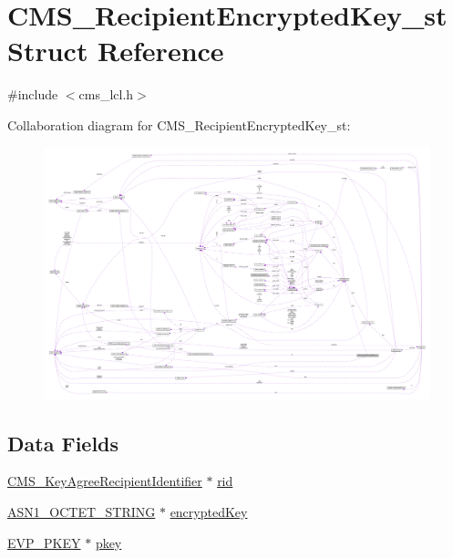 \hypertarget{struct_c_m_s___recipient_encrypted_key__st}{}\section{C\+M\+S\+\_\+\+Recipient\+Encrypted\+Key\+\_\+st Struct Reference}
\label{struct_c_m_s___recipient_encrypted_key__st}


{\ttfamily \#include $<$cms\+\_\+lcl.\+h$>$}



Collaboration diagram for C\+M\+S\+\_\+\+Recipient\+Encrypted\+Key\+\_\+st\+:\nopagebreak
\begin{figure}[H]
\begin{center}
\leavevmode
\includegraphics[width=350pt]{struct_c_m_s___recipient_encrypted_key__st__coll__graph}
\end{center}
\end{figure}
\subsection*{Data Fields}
\begin{DoxyCompactItemize}
\item 
\hyperlink{cms__lcl_8h_acafb516add3d662a5409c26641ed8f70}{C\+M\+S\+\_\+\+Key\+Agree\+Recipient\+Identifier} $\ast$ \hyperlink{struct_c_m_s___recipient_encrypted_key__st_a82da84293f12ac42af279e7e0445ddd7}{rid}
\item 
\hyperlink{crypto_2ossl__typ_8h_afbd05e94e0f0430a2b729473efec88c1}{A\+S\+N1\+\_\+\+O\+C\+T\+E\+T\+\_\+\+S\+T\+R\+I\+NG} $\ast$ \hyperlink{struct_c_m_s___recipient_encrypted_key__st_a683d211b1506ecf342fb4d35a34aed33}{encrypted\+Key}
\item 
\hyperlink{crypto_2ossl__typ_8h_a2fca4fef9e4c7a2a739b1ea04acb56ce}{E\+V\+P\+\_\+\+P\+K\+EY} $\ast$ \hyperlink{struct_c_m_s___recipient_encrypted_key__st_a76a3c5d8ec8f468075eb3e366a35a83c}{pkey}
\end{DoxyCompactItemize}


